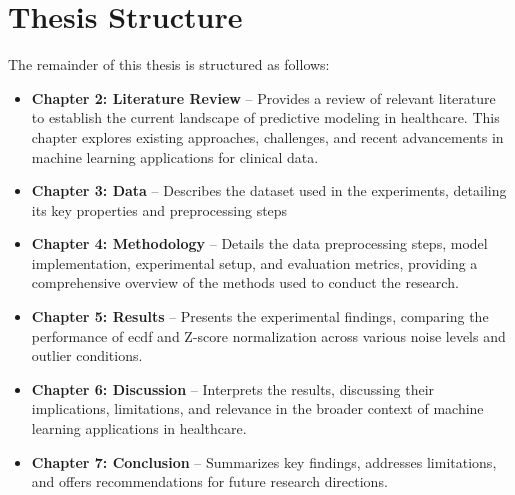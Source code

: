 \section{Thesis Structure}
The remainder of this thesis is structured as follows:

\begin{itemize}
    \item \textbf{Chapter 2: Literature Review} – Provides a review of relevant literature to establish the current landscape of predictive modeling in healthcare. This chapter explores existing approaches, challenges, and recent advancements in machine learning applications for clinical data.

    \item \textbf{Chapter 3: Data} – Describes the dataset used in the experiments, detailing its key properties and preprocessing steps

    \item \textbf{Chapter 4: Methodology} – Details the data preprocessing steps, model implementation, experimental setup, and evaluation metrics, providing a comprehensive overview of the methods used to conduct the research.

    \item \textbf{Chapter 5: Results} – Presents the experimental findings, comparing the performance of \gls{ecdf} and Z-score normalization across various noise levels and outlier conditions.

    \item \textbf{Chapter 6: Discussion} – Interprets the results, discussing their implications, limitations, and relevance in the broader context of machine learning applications in healthcare.

    \item \textbf{Chapter 7: Conclusion} – Summarizes key findings, addresses limitations, and offers recommendations for future research directions.
\end{itemize}
